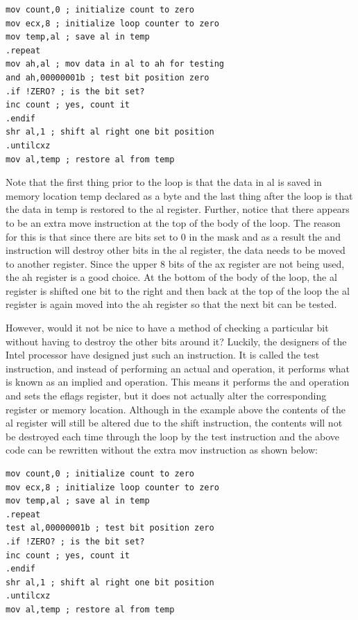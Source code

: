 \documentclass[10pt]{book}
\begin{document}
\begin{center}
\begin{verbatim}
mov count,0 ; initialize count to zero
mov ecx,8 ; initialize loop counter to zero
mov temp,al ; save al in temp
.repeat
mov ah,al ; mov data in al to ah for testing
and ah,00000001b ; test bit position zero
.if !ZERO? ; is the bit set?
inc count ; yes, count it
.endif
shr al,1 ; shift al right one bit position
.untilcxz
mov al,temp ; restore al from temp
\end{verbatim}

Note that the first thing prior to the loop is that the data in al is saved in memory location temp declared as a byte and the last thing after the loop is that the data in temp is restored to the al register. Further, notice that there appears to be an extra move instruction at the top of the body of the loop. The reason for this is that since there are bits set to 0 in the mask and as a result the and instruction will destroy other bits in the al register, the data needs to be moved to another register. Since the upper 8 bits of the ax register are not being used, the ah register is a good choice. At the bottom of the body of the loop, the al register is shifted one bit to the right and then back at the top of the loop the al register is again moved into the ah register so that the next bit can be tested.

However, would it not be nice to have a method of checking a particular bit without having to destroy the other bits around it? Luckily, the designers of the Intel processor have designed just such an instruction. It is called the test instruction, and instead of performing an actual and operation, it performs what is known as an implied and operation. This means it performs the and operation and sets the eflags register, but it does not actually alter the corresponding register or memory location. Although in the example above the contents of the al register will still be altered due to the shift instruction, the contents will not be destroyed each time through the loop by the test instruction and the above code can be rewritten without the extra mov instruction as shown below:

\begin{verbatim}
mov count,0 ; initialize count to zero
mov ecx,8 ; initialize loop counter to zero
mov temp,al ; save al in temp
.repeat
test al,00000001b ; test bit position zero
.if !ZERO? ; is the bit set?
inc count ; yes, count it
.endif
shr al,1 ; shift al right one bit position
.untilcxz
mov al,temp ; restore al from temp
\end{verbatim}


\end{center}
\end{document}
